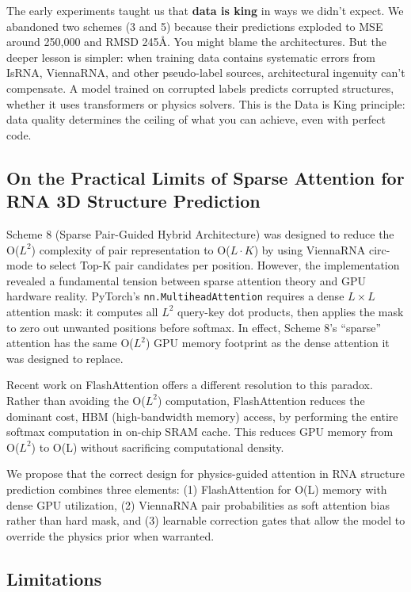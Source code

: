 \documentclass[12pt]{article}
\begin{document}
The early experiments taught us that \textbf{data is king} in ways we didn't expect. We abandoned two schemes (3 and 5) because their predictions exploded to MSE around 250,000 and RMSD 245\AA. You might blame the architectures. But the deeper lesson is simpler: when training data contains systematic errors from IsRNA, ViennaRNA, and other pseudo-label sources, architectural ingenuity can't compensate. A model trained on corrupted labels predicts corrupted structures, whether it uses transformers or physics solvers. This is the Data is King principle: data quality determines the ceiling of what you can achieve, even with perfect code.

\subsection{On the Practical Limits of Sparse Attention for RNA 3D Structure Prediction}

Scheme 8 (Sparse Pair-Guided Hybrid Architecture) was designed to reduce the O($L^2$) complexity of pair representation to O($L \cdot K$) by using ViennaRNA circ-mode to select Top-K pair candidates per position. However, the implementation revealed a fundamental tension between sparse attention theory and GPU hardware reality. PyTorch's \texttt{nn.MultiheadAttention} requires a dense $L \times L$ attention mask: it computes all $L^2$ query-key dot products, then applies the mask to zero out unwanted positions before softmax. In effect, Scheme 8's ``sparse'' attention has the same O($L^2$) GPU memory footprint as the dense attention it was designed to replace.

Recent work on FlashAttention \citep{dao2023} offers a different resolution to this paradox. Rather than avoiding the O($L^2$) computation, FlashAttention reduces the dominant cost, HBM (high-bandwidth memory) access, by performing the entire softmax computation in on-chip SRAM cache. This reduces GPU memory from O($L^2$) to O(L) without sacrificing computational density.

We propose that the correct design for physics-guided attention in RNA structure prediction combines three elements: (1) FlashAttention for O(L) memory with dense GPU utilization, (2) ViennaRNA pair probabilities as soft attention bias rather than hard mask, and (3) learnable correction gates that allow the model to override the physics prior when warranted.

\subsection{Limitations}
\end{document}
